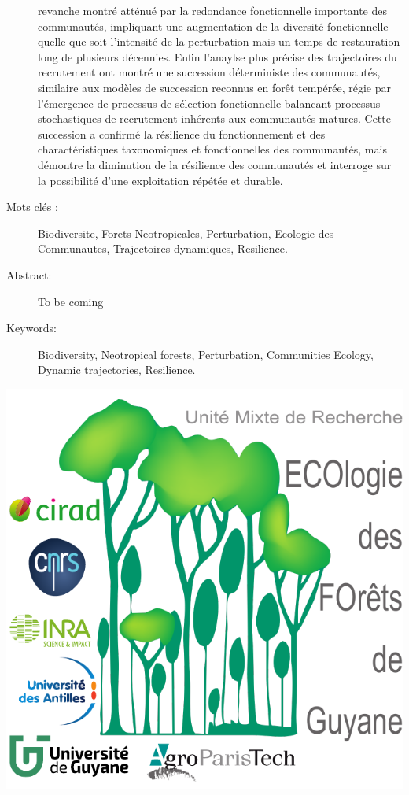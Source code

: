 \documentclass[
  11pt,
  french,
  A4paper,
  extrafontsizes,onecolumn,openright
  ]{memoir}
\begin{document}
\begin{normalsize}
\begin{description}
revanche montré atténué par la redondance fonctionnelle importante des
communautés, impliquant une augmentation de la diversité fonctionnelle
quelle que soit l'intensité de la perturbation mais un temps de
restauration long de plusieurs décennies. Enfin l'anaylse plus précise
des trajectoires du recrutement ont montré une succession déterministe
des communautés, similaire aux modèles de succession reconnus en forêt
tempérée, régie par l'émergence de processus de sélection fonctionnelle
balancant processus stochastiques de recrutement inhérents aux
communautés matures. Cette succession a confirmé la résilience du
fonctionnement et des charactéristiques taxonomiques et fonctionnelles
des communautés, mais démontre la diminution de la résilience des
communautés et interroge sur la possibilité d'une exploitation répétée
et durable.

\item[Mots clés :]
Biodiversite, Forets Neotropicales, Perturbation, Ecologie des Communautes, Trajectoires dynamiques, Resilience.
~\\

\item[Abstract:]
To be coming

\item[Keywords:]
Biodiversity, Neotropical forests, Perturbation, Communities Ecology, Dynamic trajectories, Resilience.

\end{description}

\end{normalsize}

\vspace*{\fill}
\centering\includegraphics[width=.3\textwidth]{images/Logo-Lab}
\end{document}
